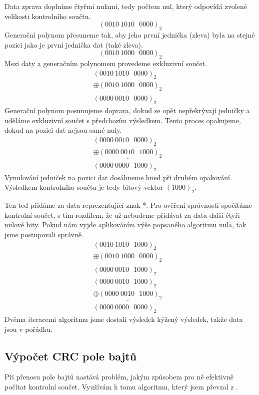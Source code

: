 Data zprava doplníme čtyřmi nulami, tedy počtem nul, který odpovídá zvolené velikosti kontrolního součtu.
$$ (0010~1010~~~0000)_2 $$
Generační polynom přesuneme tak, aby jeho první jednička (zleva) byla na stejné pozici jako je první jednička dat (také zleva).
$$ (0010~1000~~~0000)_2 $$
Mezi daty a generačním polynomem provedeme exkluzivní součet.
\begin{eqnarray}
    (0010~1010~~~0000)_2  & \nonumber\\\underline{\oplus
    (0010~1000~~~0000)_2} & \nonumber\\
    (0000~0010~~~0000)_2  & \nonumber
\end{eqnarray}
Generační polynom posunujeme doprava, dokud se opět nepřekrývají jedničky a uděláme exkluzivní součet s předchozím výsledkem. Tento proces opakujeme, dokud na pozici dat nejsou samé nuly.
\begin{eqnarray}
    (0000~0010~~~0000)_2  & \nonumber\\\underline{\oplus
    (0000~0010~~~1000)_2} & \nonumber\\
    (0000~0000~~~1000)_2  & \nonumber
\end{eqnarray}
Vynulování jedniček na pozici dat dosáhneme hned při druhém opakování. Výsledkem kontrolního součtu je tedy bitový vektor $(1000)_2$.

Ten teď přidáme za data reprezentující znak *. Pro ověření správnosti spočítáme kontrolní součet, s tím rozdílem, že už nebudeme přidávat za data další čtyři nulové bity. Pokud nám vyjde aplikováním výše popsaného algoritmu nula, tak jsme postupovali správně.
\begin{eqnarray}
    (0010~1010~~~1000)_2  & \nonumber\\\underline{\oplus
    (0010~1000~~~0000)_2} & \nonumber\\
    (0000~0010~~~1000)_2  & \nonumber
\end{eqnarray}
\begin{eqnarray}
    (0000~0010~~~1000)_2  & \nonumber\\\underline{\oplus
    (0000~0010~~~1000)_2} & \nonumber\\
    (0000~0000~~~0000)_2  & \nonumber
\end{eqnarray}
Dvěma iteracemi algoritmu jsme dostali výsledek kýžený výsledek, takže data jsou v pořádku.

\subsection{Výpočet CRC pole bajtů}
Při přenosu pole bajtů nastává problém, jakým způsobem pro ně efektivně počítat kontrolní součet. Využívám k tomu algoritmu, který jsem převzal z \cite{crc-wiki}.

